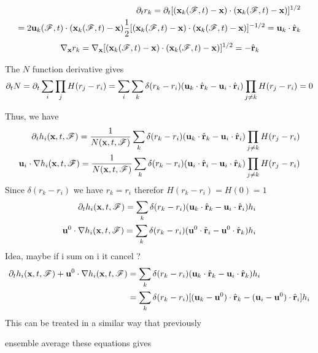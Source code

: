 \begin{align*}
    \partial_t r_k
    = \partial_t [(\textbf{x}_k(\mathscr{F},t) - \textbf{x})\cdot (\textbf{x}_k(\mathscr{F},t) - \textbf{x})]^{1/2}\\
    = 
    2 \textbf{u}_k(\mathscr{F},t)  \cdot (\textbf{x}_k(\mathscr{F},t) - \textbf{x})
    \frac{1}{2}[(\textbf{x}_k(\mathscr{F},t) - \textbf{x})\cdot (\textbf{x}_k(\mathscr{F},t) - \textbf{x})]^{- 1/2}
    = 
    \textbf{u}_k  \cdot \hat{\textbf{r}}_k
\end{align*}
\begin{align*}
    {\mathbf{\nabla}_\textbf{x}} r_k
    = {\mathbf{\nabla}_\textbf{x}} [(\textbf{x}_k(\mathscr{F},t) - \textbf{x})\cdot (\textbf{x}_k(\mathscr{F},t) - \textbf{x})]^{1/2}
    = - \hat{\textbf{r}}_k
\end{align*}

The $N$ function derivative gives 
\begin{equation*}
    \partial_t 
    N 
    = \partial_t 
    \sum_i \prod_j
    H(r_j - r_i)
    = 
    \sum_i 
    \sum_k 
    \delta(r_k - r_i)
    (\textbf{u}_k  \cdot \hat{\textbf{r}}_k - \textbf{u}_i  \cdot \hat{\textbf{r}}_i)
    \prod_{j\neq k}
    H(r_j - r_i) = 0 
\end{equation*}

Thus, we have \citet{zhang2021ensemble} 
\begin{align*}
    \partial_t  h_i(\textbf{x},t,\mathscr{F})
    = 
    \frac{1}{N(\textbf{x},t,\mathscr{F})}
    \sum_k 
    \delta(r_k - r_i)
    (\textbf{u}_k  \cdot \hat{\textbf{r}}_k - \textbf{u}_i  \cdot \hat{\textbf{r}}_i)
    \prod_{j\neq k}
    H(r_j - r_i)
    \\
    \textbf{u}_i \cdot \mathbf{\nabla} h_i(\textbf{x},t,\mathscr{F})
    = 
    \frac{1}{N(\textbf{x},t,\mathscr{F})}
    \sum_k 
    \delta(r_k - r_i)
    (\textbf{u}_i  \cdot \hat{\textbf{r}}_i -  \textbf{u}_i  \cdot\hat{\textbf{r}}_k)
    \prod_{j\neq k}
    H(r_j - r_i)
    \\
\end{align*}
Since $\delta(r_k - r_i)$ we have $r_k = r_i$ therefor $H(r_k - r_i) = H(0) = 1 $
\begin{align*}
    \partial_t  h_i(\textbf{x},t,\mathscr{F})
    = 
    \sum_k 
    \delta(r_k - r_i)
    (\textbf{u}_k  \cdot \hat{\textbf{r}}_k - \textbf{u}_i  \cdot \hat{\textbf{r}}_i)
    h_i
    \\
    \textbf{u}^0 \cdot \mathbf{\nabla} h_i(\textbf{x},t,\mathscr{F})
    = 
    \sum_k 
    \delta(r_k - r_i)
    (\textbf{u}^0  \cdot \hat{\textbf{r}}_i -  \textbf{u}^0  \cdot\hat{\textbf{r}}_k)
    h_i
    \\
\end{align*}
Idea, maybe if i sum on i it cancel ? 
\begin{align*}
    \partial_t  h_i(\textbf{x},t,\mathscr{F}) +\textbf{u}^0 \cdot \mathbf{\nabla} h_i(\textbf{x},t,\mathscr{F})
    &= 
    \sum_k 
    \delta(r_k - r_i)
    (\textbf{u}_k  \cdot \hat{\textbf{r}}_k  - \textbf{u}_i  \cdot \hat{\textbf{r}}_k)
    h_i
    \\
    &= 
    \sum_k 
    \delta(r_k - r_i)
    [(\textbf{u}_k  - \textbf{u}^0) \cdot \hat{\textbf{r}}_k - (\textbf{u}_i - \textbf{u}^0)  \cdot \hat{\textbf{r}}_i]
    h_i
    \\
\end{align*}
This can be treated in a similar way that previously

ensemble average these equations gives 
